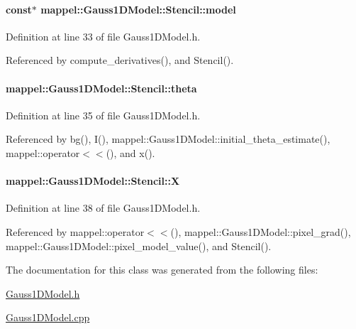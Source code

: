 \paragraph[{\texorpdfstring{model}{model}}]{ const$\ast$ mappel\+::\+Gauss1\+D\+Model\+::\+Stencil\+::model}\hypertarget{classmappel_1_1Gauss1DModel_1_1Stencil_a22c7f0f7fd29ee1cc587f331ef186c76}{}\label{classmappel_1_1Gauss1DModel_1_1Stencil_a22c7f0f7fd29ee1cc587f331ef186c76}


Definition at line 33 of file Gauss1\+D\+Model.\+h.



Referenced by compute\+\_\+derivatives(), and Stencil().

\paragraph[{\texorpdfstring{theta}{theta}}]{ mappel\+::\+Gauss1\+D\+Model\+::\+Stencil\+::theta}\hypertarget{classmappel_1_1Gauss1DModel_1_1Stencil_a2428fa45a83396cad7861fbeea44a86a}{}\label{classmappel_1_1Gauss1DModel_1_1Stencil_a2428fa45a83396cad7861fbeea44a86a}


Definition at line 35 of file Gauss1\+D\+Model.\+h.



Referenced by bg(), I(), mappel\+::\+Gauss1\+D\+Model\+::initial\+\_\+theta\+\_\+estimate(), mappel\+::operator$<$$<$(), and x().

\paragraph[{\texorpdfstring{X}{X}}]{ mappel\+::\+Gauss1\+D\+Model\+::\+Stencil\+::X}\hypertarget{classmappel_1_1Gauss1DModel_1_1Stencil_a1cb021aeb56c7fadd2a6b401d95239ae}{}\label{classmappel_1_1Gauss1DModel_1_1Stencil_a1cb021aeb56c7fadd2a6b401d95239ae}


Definition at line 38 of file Gauss1\+D\+Model.\+h.



Referenced by mappel\+::operator$<$$<$(), mappel\+::\+Gauss1\+D\+Model\+::pixel\+\_\+grad(), mappel\+::\+Gauss1\+D\+Model\+::pixel\+\_\+model\+\_\+value(), and Stencil().



The documentation for this class was generated from the following files\+:\begin{DoxyCompactItemize}
\item 
\hyperlink{Gauss1DModel_8h}{Gauss1\+D\+Model.\+h}\item 
\hyperlink{Gauss1DModel_8cpp}{Gauss1\+D\+Model.\+cpp}\end{DoxyCompactItemize}
